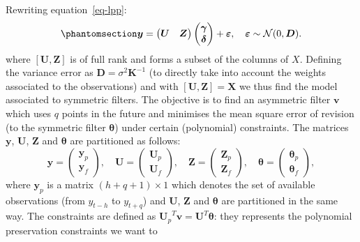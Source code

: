 \documentclass[
]{article}
\newcommand\transp[1]{{#1}^T}
\newcommand\1{\mathds{1}}
\begin{document}
Rewriting equation~\ref{eq-lpp}:
\begin{equation}\phantomsection\label{eq-lpgeneralmodel}{
\boldsymbol y=\begin{pmatrix}\boldsymbol U &\boldsymbol Z\end{pmatrix}
\begin{pmatrix}\boldsymbol \gamma \\ \boldsymbol \delta\end{pmatrix}+\boldsymbol \varepsilon,\quad
\boldsymbol \varepsilon\sim\mathcal{N}(0,\boldsymbol D).
}\end{equation} where \([\boldsymbol U,\boldsymbol Z]\) is of full rank
and forms a subset of the columns of \(X.\) Defining the variance error
as \(\boldsymbol D = \sigma^2\boldsymbol K^{-1}\) (to directly take into
account the weights associated to the observations) and with
\([\boldsymbol U,\boldsymbol Z] = \boldsymbol X\) we thus find the model
associated to symmetric filters. The objective is to find an asymmetric
filter \(\boldsymbol v\) which uses \(q\) points in the future and
minimises the mean square error of revision (to the symmetric filter
\(\boldsymbol \theta\)) under certain (polynomial) constraints. The
matrices \(\boldsymbol y\), \(\boldsymbol U\), \(\boldsymbol Z\) and
\(\boldsymbol \theta\) are partitioned as follows: \[
\boldsymbol y = \begin{pmatrix} \boldsymbol y_p \\ \boldsymbol y_f \end{pmatrix}, \quad
\boldsymbol U = \begin{pmatrix} \boldsymbol U_p \\ \boldsymbol U_f \end{pmatrix}, \quad  
\boldsymbol Z = \begin{pmatrix} \boldsymbol Z_p \\ \boldsymbol Z_f \end{pmatrix}, \quad 
\boldsymbol \theta = \begin{pmatrix} \boldsymbol \theta_p \\ \boldsymbol \theta_f \end{pmatrix},
\] where \(\boldsymbol y_p\) is a matrix \((h+q+1)\times 1\) which
denotes the set of available observations (from \(y_{t-h}\) to
\(y_{t+q}\)) and \(\boldsymbol U\), \(\boldsymbol Z\) and
\(\boldsymbol \theta\) are partitioned in the same way. The constraints
are defined as
\(\transp{\boldsymbol U_p}\boldsymbol v=\transp{\boldsymbol U}\boldsymbol \theta\):
they represents the polynomial preservation constraints we want to
\end{document}

